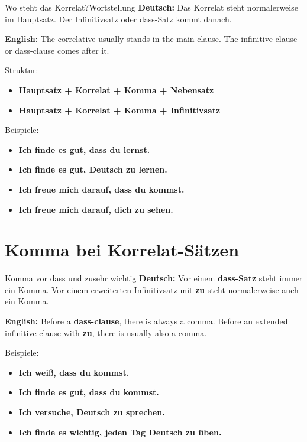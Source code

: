 \documentclass[a4paper,11pt]{article}
\newcommand{\GermanText}[1]{\textbf{Deutsch: }#1\par}
\newcommand{\EnglishText}[1]{{\small\color{SoftGray}\textbf{English: }#1\par}}
\begin{document}
        \begin{grammarentry}{Wo steht das Korrelat?}{Wortstellung}
            \GermanText{Das Korrelat steht normalerweise im Hauptsatz. Der Infinitivsatz oder dass-Satz kommt danach.}
            \EnglishText{The correlative usually stands in the main clause. The infinitive clause or dass-clause comes after it.}
            
            Struktur:
            \begin{itemize}
                \item \textbf{Hauptsatz + Korrelat + Komma + Nebensatz}
                \item \textbf{Hauptsatz + Korrelat + Komma + Infinitivsatz}
            \end{itemize}
            
            Beispiele:
            \begin{itemize}
                \item \textbf{Ich finde es gut, dass du lernst.}
                \item \textbf{Ich finde es gut, Deutsch zu lernen.}
                \item \textbf{Ich freue mich darauf, dass du kommst.}
                \item \textbf{Ich freue mich darauf, dich zu sehen.}
            \end{itemize}
        \end{grammarentry}
    
    
    \section{Komma bei Korrelat-Sätzen}
        
        \begin{grammarentry}{Komma vor dass und zu}{sehr wichtig}
            \GermanText{Vor einem \textbf{dass-Satz} steht immer ein Komma. Vor einem erweiterten Infinitivsatz mit \textbf{zu} steht normalerweise auch ein Komma.}
            \EnglishText{Before a \textbf{dass-clause}, there is always a comma. Before an extended infinitive clause with \textbf{zu}, there is usually also a comma.}
            
            Beispiele:
            \begin{itemize}
                \item \textbf{Ich weiß, dass du kommst.}
                \item \textbf{Ich finde es gut, dass du kommst.}
                \item \textbf{Ich versuche, Deutsch zu sprechen.}
                \item \textbf{Ich finde es wichtig, jeden Tag Deutsch zu üben.}
            \end{itemize}
        \end{grammarentry}
    
\end{document}
